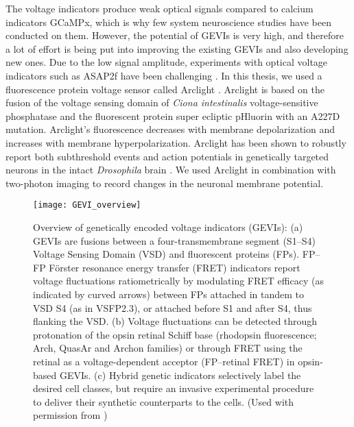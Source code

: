 The voltage indicators produce weak optical signals compared to calcium indicators GCaMPx, which is why few system neuroscience studies have been conducted on them. However, the potential of GEVIs is very high, and therefore a lot of effort is being put into improving the existing GEVIs and also developing new ones. Due to the low signal amplitude, experiments with optical voltage indicators such as ASAP2f have been challenging \parencite{Yang2016}. In this thesis, we used a fluorescence protein voltage sensor called Arclight \parencite{Jin2012}. Arclight is based on the fusion of the voltage sensing domain of \textit{Ciona intestinalis} voltage-sensitive phosphatase \parencite{Murata2005} and the fluorescent protein super ecliptic pHluorin with an A227D mutation. Arclight's fluorescence decreases with membrane depolarization and increases with membrane hyperpolarization. Arclight has been shown to robustly report both subthreshold events and action potentials in genetically targeted neurons in the intact \textit{Drosophila} brain \parencite{Cao2013}. We used Arclight in combination with two-photon imaging to record changes in the neuronal membrane potential.

\begin{figure}
\centering
\hspace*{-1cm} 
\texttt{[image: GEVI\_overview]}
\caption[Overview of genetically encoded voltage indicators (GEVIs)] {Overview of genetically encoded voltage indicators (GEVIs): (a) GEVIs are fusions between a four-transmembrane segment (S1–S4) Voltage Sensing Domain (VSD) and fluorescent proteins (FPs). FP–FP Förster resonance energy transfer (FRET) indicators report voltage fluctuations ratiometrically by modulating FRET efficacy (as indicated by curved arrows) between FPs attached in tandem to VSD S4 (as in VSFP2.3), or attached before S1 and after S4, thus flanking the VSD. (b) Voltage fluctuations can be detected through protonation of the opsin retinal Schiff base (rhodopsin fluorescence; Arch, QuasAr and Archon families) or through FRET using the retinal as a voltage-dependent acceptor (FP–retinal FRET) in opsin-based GEVIs. (c) Hybrid genetic indicators selectively label the desired cell classes, but require an invasive experimental procedure to deliver their synthetic counterparts to the cells. (Used with permission from \parencite{Knopfel2019})} 
\label{fig:voltageindicators}
\end{figure}

